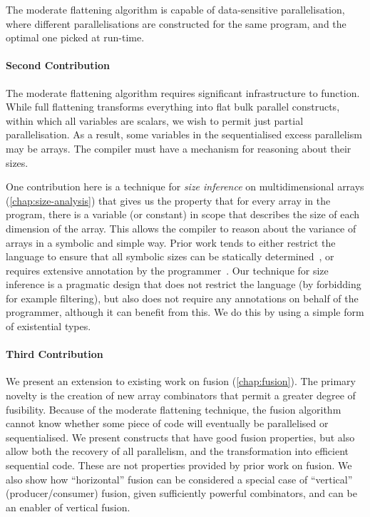 The moderate flattening algorithm is capable of data-sensitive
parallelisation, where different parallelisations are constructed for
the same program, and the optimal one picked at run-time.

\paragraph{Second Contribution}

The moderate flattening algorithm requires significant infrastructure
to function.  While full flattening transforms everything into flat
bulk parallel constructs, within which all variables are scalars, we
wish to permit just partial parallelisation.  As a result, some
variables in the sequentialised excess parallelism may be arrays.  The
compiler must have a mechanism for reasoning about their sizes.

One contribution here is a technique for \textit{size inference} on
multidimensional arrays (\cref{chap:size-analysis}) that gives us the
property that for every array in the program, there is a variable (or
constant) in scope that describes the size of each dimension of the
array.  This allows the compiler to reason about the variance of
arrays in a symbolic and simple way.  Prior work tends to either
restrict the language to ensure that all symbolic sizes can be
statically determined~\cite{fish}, or requires extensive annotation by
the programmer~\cite{brady2013idris,bove2009dependent}.  Our technique
for size inference is a pragmatic design that does not restrict the
language (by forbidding for example filtering), but also does not
require any annotations on behalf of the programmer, although it can
benefit from this.  We do this by using a simple form of existential
types.

\paragraph{Third Contribution}

We present an extension to existing work on fusion
(\cref{chap:fusion}).  The primary novelty is the creation of new
array combinators that permit a greater degree of fusibility.  Because
of the moderate flattening technique, the fusion algorithm cannot know
whether some piece of code will eventually be parallelised or
sequentialised.  We present constructs that have good fusion
properties, but also allow both the recovery of all parallelism, and
the transformation into efficient sequential code.  These are not
properties provided by prior work on fusion.  We also show how
``horizontal'' fusion can be considered a special case of ``vertical''
(producer/consumer) fusion, given sufficiently powerful combinators,
and can be an enabler of vertical fusion.

